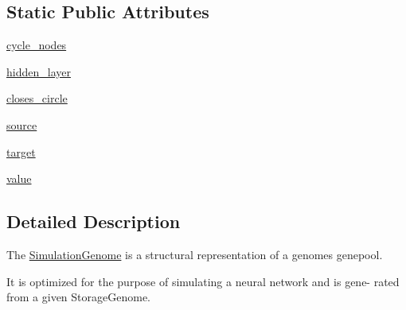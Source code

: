 \subsection*{Static Public Attributes}
\begin{DoxyCompactItemize}
\item 
\hyperlink{classNEAT__PyGenetics_1_1NEAT_1_1GenomeStructures_1_1SimulationStructure_1_1SimulationGenome_1_1SimulationGenome_aa650dc24f64c63322197e5eabd879453}{cycle\+\_\+nodes}
\item 
\hyperlink{classNEAT__PyGenetics_1_1NEAT_1_1GenomeStructures_1_1SimulationStructure_1_1SimulationGenome_1_1SimulationGenome_a66d27e8ed15eb8473d63728d6fa046fe}{hidden\+\_\+layer}
\item 
\hyperlink{classNEAT__PyGenetics_1_1NEAT_1_1GenomeStructures_1_1SimulationStructure_1_1SimulationGenome_1_1SimulationGenome_a246a2949988d817f3ba2e5a27ce0cb26}{closes\+\_\+circle}
\item 
\hyperlink{classNEAT__PyGenetics_1_1NEAT_1_1GenomeStructures_1_1SimulationStructure_1_1SimulationGenome_1_1SimulationGenome_ac4b5b345246df8c26156052e19d88dc3}{source}
\item 
\hyperlink{classNEAT__PyGenetics_1_1NEAT_1_1GenomeStructures_1_1SimulationStructure_1_1SimulationGenome_1_1SimulationGenome_ac175e1e9455296d28d7486373e2546c7}{target}
\item 
\hyperlink{classNEAT__PyGenetics_1_1NEAT_1_1GenomeStructures_1_1SimulationStructure_1_1SimulationGenome_1_1SimulationGenome_a27b218236fdf7a6526bdddef382a38e9}{value}
\end{DoxyCompactItemize}


\subsection{Detailed Description}
The \hyperlink{classNEAT__PyGenetics_1_1NEAT_1_1GenomeStructures_1_1SimulationStructure_1_1SimulationGenome_1_1SimulationGenome}{Simulation\+Genome} is a structural representation of a genome\textquotesingle{}s genepool. 

It is optimized for the purpose of simulating a neural network and is gene-\/ rated from a given Storage\+Genome.

